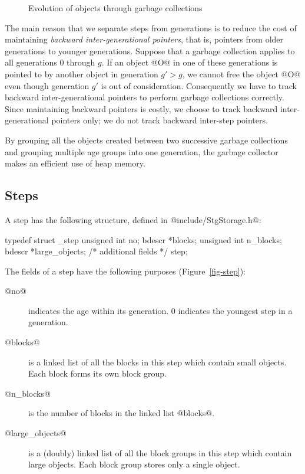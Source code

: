 \documentclass{article}
\begin{document}
\begin{figure}[ht]
\begin{center}

\caption{Evolution of objects through garbage collections}
\label{fig-generation}
\end{center}
\end{figure}

The main reason that we separate steps from generations is to
reduce the cost of maintaining \emph{backward inter-generational pointers},
that is, pointers from older generations to younger generations.
Suppose that a garbage collection applies to all generations $0$
through $g$. If an object @O@ in one of these generations is pointed to
by another object in generation $g' > g$, we cannot free the object @O@
even though generation $g'$ is out of consideration. Consequently
we have to track backward inter-generational pointers to perform garbage
collections correctly.
Since maintaining backward pointers is costly, we
choose to track backward inter-generational pointers only;
we do not track backward inter-step pointers.

By grouping all the objects created between two successive garbage collections
and grouping multiple age groups into one generation, the garbage
collector makes an efficient use of heap memory.

\subsection{Steps}

A step has the following structure, defined in 
@include/StgStorage.h@:

\begin{code}
typedef struct _step {
  unsigned int no;
  bdescr *blocks;
  unsigned int n_blocks;
  bdescr *large_objects;
  /* additional fields */
} step;
\end{code}

The fields of a step have the following purposes (Figure~\ref{fig-step}):

\begin{description}
\item[@no@] indicates the age within its generation. 
$0$ indicates the youngest step in a generation.
\item[@blocks@] is a linked list of all the blocks in this step 
which contain small objects.
Each block forms its own block group.
\item[@n\_blocks@] is the number of blocks in the linked list @blocks@.
\item[@large\_objects@] is a (doubly) linked list of all the block groups 
in this step which contain large objects. 
Each block group stores only a single object.
\end{description}
\end{document}
